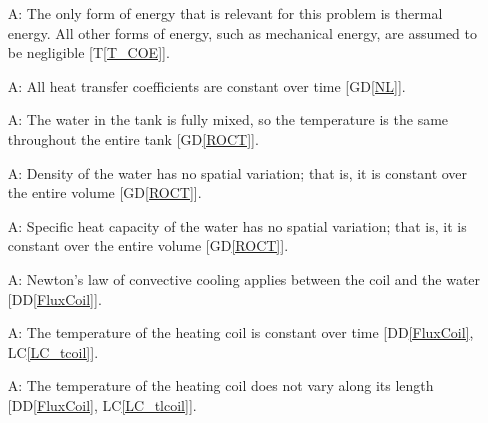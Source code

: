\documentclass[12pt]{article}
\newcommand{\dref}[1]{GD\ref{#1}}
\newcommand{\ddref}[1]{DD\ref{#1}}
\newcommand{\tref}[1]{T\ref{#1}}
\newcounter{assumpnum} %
\newcommand{\lcref}[1]{LC\ref{#1}}
\begin{document}
\begin{itemize}

\item[A\refstepcounter{assumpnum}\theassumpnum \label{A_OnlyThermalEnergy}:] The
  only form of energy that is relevant for this problem is thermal energy.  All
  other forms of energy, such as mechanical energy, are assumed to be
  negligible [\tref{T_COE}].

\item[A\refstepcounter{assumpnum}\theassumpnum \label{A_hcoeff}:] All heat
  transfer coefficients are constant over time [\dref{NL}].

\item[A\refstepcounter{assumpnum}\theassumpnum \label{A_mixed}:] The water in
  the tank is fully mixed, so the temperature is the same throughout the entire
  tank [\dref{ROCT}].%


\item[A\refstepcounter{assumpnum}\theassumpnum \label{A_const_density}:] Density
  of the water
has no spatial variation; that is, it is
  constant over the entire volume [\dref{ROCT}].

\item[A\refstepcounter{assumpnum}\theassumpnum \label{A_const_C}:] Specific heat
  capacity of the water 
has no spatial variation; that is, it is
 constant over the entire volume [\dref{ROCT}].

\item[A\refstepcounter{assumpnum}\theassumpnum \label{A_Newt_coil}:] Newton's
  law of convective cooling applies between the coil and the water [\ddref{FluxCoil}].
	
\item[A\refstepcounter{assumpnum}\theassumpnum \label{A_tcoil}:] The temperature
  of the heating coil is constant over time [\ddref{FluxCoil}, \lcref{LC_tcoil}].
	
\item[A\refstepcounter{assumpnum}\theassumpnum \label{A_tlcoil}:] The
  temperature of the heating coil does not vary along its
  length [\ddref{FluxCoil}, \lcref{LC_tlcoil}].



\end{itemize}
\end{document}
